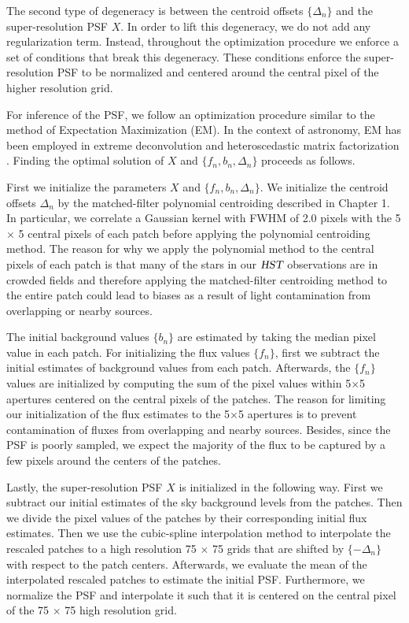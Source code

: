 The second type of degeneracy is between the centroid offsets $\{\Delta_n\}$ and the super-resolution PSF $X$. In order to lift this degeneracy, we do not add any regularization 
term. Instead, throughout the optimization procedure we enforce a set of conditions that break this degeneracy. These conditions enforce the super-resolution 
PSF to be normalized and centered around the central pixel of the higher resolution grid. 

For inference of the PSF, we follow an optimization procedure similar to the method of Expectation Maximization (EM). In the context of astronomy, EM has been employed in extreme deconvolution \citep{xd} and heteroscedastic matrix factorization \citep{hmf}. Finding the optimal solution of 
$X$ and $\{f_n , b_n , \Delta_n\}$ proceeds as follows. 

First we initialize the parameters $X$ and $\{f_n , b_n , \Delta_n\}$. We initialize the centroid offsets ${\Delta_n}$ by the matched-filter polynomial centroiding 
described in Chapter 1. In particular, we correlate a Gaussian kernel with FWHM of 2.0 pixels with the 5 $\times$ 5 central pixels of each patch before applying 
the polynomial centroiding method. The reason for why we apply the polynomial method to the central pixels of each patch is that many of the stars in our ${\textsl{HST}}$ observations 
are in crowded fields and therefore applying the matched-filter centroiding method to the entire patch could lead to biases as a result of light contamination from overlapping 
or nearby sources. 

The initial background values $\{b_n\}$ are estimated by taking the median pixel value in each patch. For initializing the flux values $\{f_n\}$, first we subtract the initial 
estimates of background values from each patch. Afterwards, the $\{f_n\}$ values are initialized by computing the sum of the pixel values within 5$\times$5 apertures centered on 
the central pixels of the patches. The reason for limiting our initialization of the flux estimates to the 5$\times$5 apertures is to prevent contamination of fluxes from 
overlapping and nearby sources. Besides, since the PSF is poorly sampled, we expect the majority of the flux to be captured by a few pixels around the centers of the patches. 

Lastly, the super-resolution PSF $X$ is initialized in the following way. First we subtract our initial estimates of the sky background levels from the patches. Then we divide the 
pixel values of the patches by their corresponding initial flux estimates. Then we use the cubic-spline interpolation method to interpolate the rescaled patches to a high resolution 
75 $\times$ 75 grids that are shifted by $\{-\Delta_n\}$ with respect to the patch centers. Afterwards, we evaluate the mean of the interpolated rescaled patches 
to estimate the initial PSF. Furthermore, we normalize the PSF and interpolate it such that it is centered on the central pixel of the 75 $\times$ 75 high resolution grid.  


